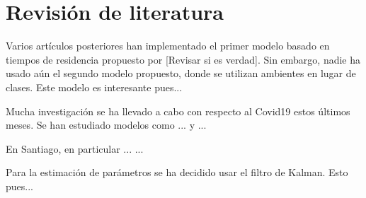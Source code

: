 \section{Revisión de literatura} \label{sec:literatura} 





Varios artículos posteriores han implementado el primer modelo basado en tiempos de residencia propuesto por \cite{Bichara2015} [Revisar si es verdad]. Sin embargo, nadie ha usado aún el segundo modelo propuesto, donde se utilizan ambientes en lugar de clases. Este modelo es interesante pues... 




Mucha investigación se ha llevado a cabo con respecto al Covid19 estos últimos meses. Se han estudiado modelos como ... y ... 

En Santiago, en particular ... ... 



Para la estimación de parámetros se ha decidido usar el filtro de Kalman. Esto pues... %

